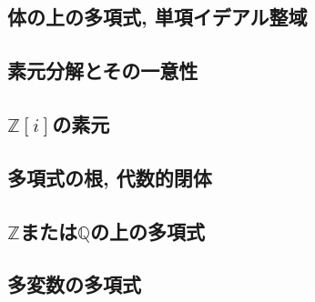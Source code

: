 \documentclass[uplatex,dvipdfmx,9pt]{beamer}
\newcommand{\Z}{\mathbb{Z}}
\newcommand{\Q}{\mathbb{Q}}
\newcommand{\sscount}{\textsection \thesubsection}
\newcounter{textExmCount}
\theoremstyle{definition} %
\theoremstyle{example}
\begin{document}
\subsection{\sscount 体の上の多項式, 単項イデアル整域}
\setcounter{textExmCount}{0}

\subsection{\sscount 素元分解とその一意性}
\setcounter{textExmCount}{0}

\subsection{\sscount \texorpdfstring{ $\Z[i]$}{Z[i]}の素元}
\setcounter{textExmCount}{0}

\subsection{\sscount 多項式の根, 代数的閉体}
\setcounter{textExmCount}{0}

\subsection{\sscount \texorpdfstring{ $\Z$または$\Q$}{ZまたはQ}の上の多項式}
\setcounter{textExmCount}{0}

\subsection{\sscount 多変数の多項式}
\setcounter{textExmCount}{0}
\end{document}
